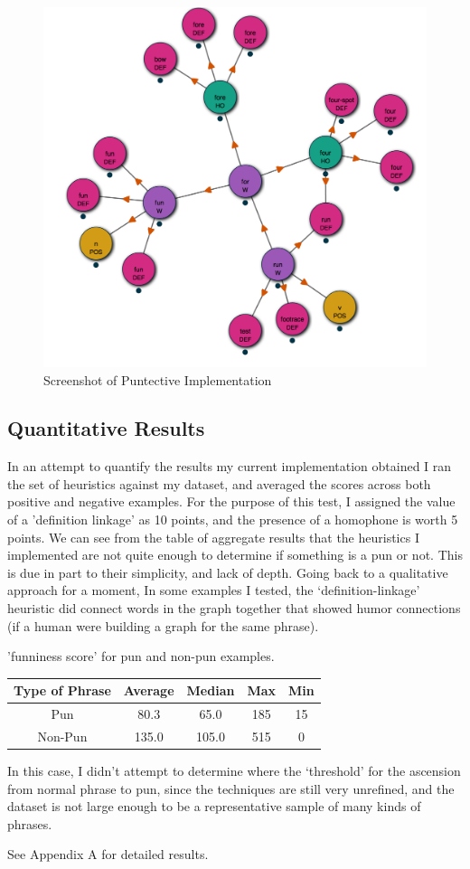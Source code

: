 \begin{center}
\begin{figure}[h]
  \includegraphics[keepaspectratio=true, scale=.35]{pun-graph.png}
  \caption{Screenshot of Puntective Implementation}
   \label{pungraphscreenshot}
\end{figure}
\end{center}

\subsection{Quantitative Results}
In an attempt to quantify the results my current implementation obtained I ran the set of heuristics against my dataset, and averaged the scores across both positive and negative examples. For the purpose of this test, I assigned the value of a 'definition linkage' as 10 points, and the presence of a homophone is worth 5 points.  We can see from the table of aggregate results that the heuristics I implemented are not quite enough to determine if something is a pun or not. This is due in part to their simplicity, and lack of depth. Going back to a qualitative approach for a moment, In some examples I tested, the `definition-linkage' heuristic did connect words in the graph together that showed humor connections (if a human were building a graph for the same phrase).

\begin{center}
'funniness score' for pun and non-pun examples.
 \begin{tabular}{||c c c c c||}
 \hline
 Type of Phrase & Average & Median & Max  & Min \\ [0.5ex] 
 \hline\hline
 Pun & 80.3 & 65.0 &  185 & 15 \\ 
 \hline
 Non-Pun & 135.0 & 105.0 & 515 & 0 \\
 \hline
\end{tabular}
\end{center}

In this case, I didn't attempt to determine where the `threshold' for the ascension from normal phrase to pun, since the techniques are still very unrefined, and the dataset is not large enough to be a representative sample of many kinds of phrases.

See Appendix A for detailed results.
